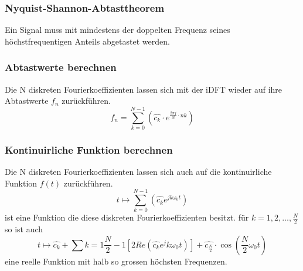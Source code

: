 \subsubsection{Nyquist-Shannon-Abtasttheorem}
Ein Signal muss mit mindestens der doppelten Frequenz seines höchstfrequentigen Anteils abgetastet werden.

\subsubsection{Abtastwerte berechnen}
Die N diskreten Fourierkoeffizienten lassen sich mit der iDFT wieder auf ihre Abtastwerte $f_n$ zurückführen.
$$f_n=\sum\limits_{k=0}^{N-1}(\hat{c_k}\cdot e^{\frac{2\pi j}{N}\cdot nk})$$
\subsubsection{Kontinuirliche Funktion berechnen}
Die N diskreten Fourierkoeffizienten lassen sich auch auf die kontinuirliche Funktion $f(t)$ zurückführen.
$$t\mapsto \sum\limits_{k=0}^{N-1}(\hat{c_k}e^{jk\omega_0t})$$ 
ist eine Funktion die diese diskreten Fourierkoeffizienten besitzt.
für $k=1,2,\ldots,\frac{N}{2}$ so ist auch 
$$t\mapsto\hat{c_k}+\sum\limits{k=1}{\frac{N}{2}-1}[2 
Re(\hat{c_k}e^jk\omega_0t)]+\hat{c_\frac{N}{2}}\cdot \cos(\frac{N}{2}\omega_0t)$$
eine reelle Funktion mit halb so grossen höchsten Frequenzen. 
